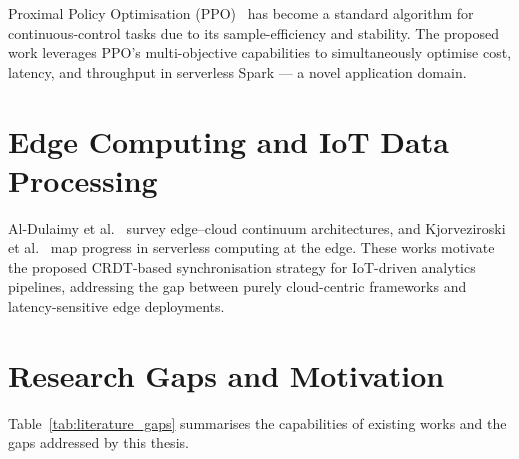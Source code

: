 Proximal Policy Optimisation (PPO)~\cite{schulman2017ppo} has become a standard
algorithm for continuous-control tasks due to its sample-efficiency and stability. The
proposed work leverages PPO's multi-objective capabilities to simultaneously optimise
cost, latency, and throughput in serverless Spark — a novel application domain.

\section{Edge Computing and IoT Data Processing}
Al-Dulaimy et al.~\cite{alDulaimy2024continuum} survey edge--cloud continuum
architectures, and Kjorveziroski et al.~\cite{kjorveziroski2021iot} map progress in
serverless computing at the edge. These works motivate the proposed CRDT-based
synchronisation strategy for IoT-driven analytics pipelines, addressing the gap between
purely cloud-centric frameworks and latency-sensitive edge deployments.

\section{Research Gaps and Motivation}
Table~\ref{tab:literature_gaps} summarises the capabilities of existing works and the
gaps addressed by this thesis.

